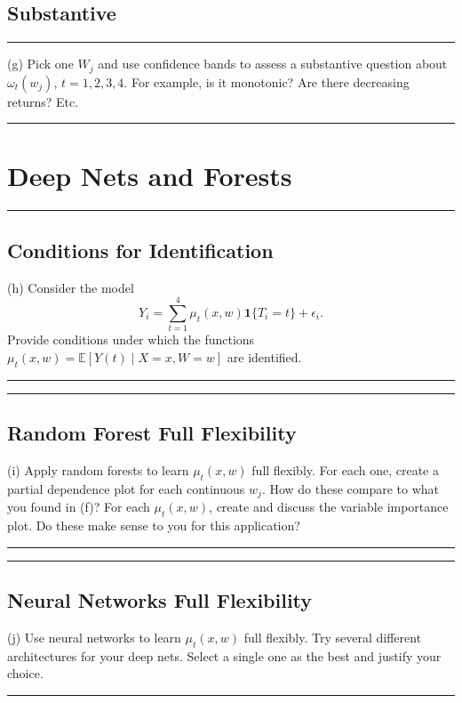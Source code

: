 \documentclass{article}
\newenvironment{colorparagraph}[1]{\par\color{#1}}{\par}
\begin{document}
\begin{colorparagraph}{questioncolor}
\label{q3g}
\subsection{Substantive}
\rule{\textwidth}{0.5pt}
(g) Pick one \( W_j \) and use confidence bands to assess a substantive question about \( \omega_t(w_j) \), \( t = 1, 2, 3, 4 \). For example, is it monotonic? Are there decreasing returns? Etc.

\rule{\textwidth}{0.5pt}
\end{colorparagraph}

\begin{colorparagraph}{questioncolor}
\section*{Deep Nets and Forests}
\label{q3h}
\rule{\textwidth}{0.5pt}
\subsection{Conditions for Identification}
(h) Consider the model
\[
Y_i = \sum_{t=1}^4 \mu_t(x, w) \mathbf{1}\{T_i = t\} + \epsilon_i.
\]
Provide conditions under which the functions \( \mu_t(x, w) = \mathbb{E}[Y(t) \mid X = x, W = w] \) are identified.

\rule{\textwidth}{0.5pt}
\end{colorparagraph}

\begin{colorparagraph}{questioncolor}
\label{q3i}
\rule{\textwidth}{0.5pt}
\subsection{Random Forest Full Flexibility}
(i) Apply random forests to learn \( \mu_t(x, w) \) full flexibly. For each one, create a partial dependence plot for each continuous \( w_j \). How do these compare to what you found in (f)? For each \( \mu_t(x, w) \), create and discuss the variable importance plot. Do these make sense to you for this application?

\rule{\textwidth}{0.5pt}
\end{colorparagraph}

\begin{colorparagraph}{questioncolor}
\label{q3j}
\rule{\textwidth}{0.5pt}
\subsection{Neural Networks Full Flexibility}
(j) Use neural networks to learn \( \mu_t(x, w) \) full flexibly. Try several different architectures for your deep nets. Select a single one as the best and justify your choice.

\rule{\textwidth}{0.5pt}
\end{colorparagraph}
\end{document}
